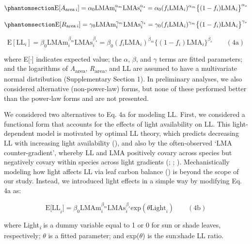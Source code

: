 \documentclass[
  12pt,
  letterpaper,
  DIV=11,
  numbers=noendperiod]{scrartcl}
\begin{document}
\begin{equation}\phantomsection\label{eq-Aarea}{
\mathrm{E}[A_{\mathrm{area} \, i}]
= \alpha_0\mathrm{LMAm}_{i}^{\alpha_m}\mathrm{LMAs}_i^{\alpha_s}  =  \alpha_0 (f_i \mathrm{LMA}_{i})^{\alpha_m} \bigl\{(1-f_i) \mathrm{LMA}_{i}\bigr\}^{\alpha_s}
}\end{equation}

\begin{equation}\phantomsection\label{eq-Rarea}{
\mathrm{E}[R_{\mathrm{area} \, i}]
= \gamma_0\mathrm{LMAm}_{i}^{\gamma_m} \mathrm{LMAs}_{i}^{\gamma_s}
= \gamma_0 (f_i \mathrm{LMA}_{i})^{\gamma_m} \bigl\{(1-f_i)\mathrm{LMA}_{i}\bigr\}^{\gamma_s}
}\end{equation}

\[
\mathrm{E}[\mathrm{LL}_i] = \beta_0\mathrm{LMAm}_{i}^{\beta_m} \mathrm{LMAs}_{i}^{\beta_s}  = \beta_0 (f_i \mathrm{LMA}_{i})^{\beta_m} \bigl\{(1-f_i) \mathrm{LMA}_{i}\bigr\}^{\beta_s} \qquad(4\mathrm{a})
\]

where E{[}\(\cdot\){]} indicates expected value; the \(\alpha\),
\(\beta\), and \(\gamma\) terms are fitted parameters; and the
logarithms of \emph{A}\textsubscript{area},
\emph{R}\textsubscript{area}, and LL are assumed to have a multivariate
normal distribution (Supplementary Section 1). In preliminary analyses,
we also considered alternative (non-power-law) forms, but none of these
performed better than the power-law forms and are not presented.

We considered two alternatives to Eq. 4a for modeling LL. First, we
considered a functional form that accounts for the effects of light
availability on LL. This light-dependent model is motivated by optimal
LL theory, which predicts decreasing LL with increasing light
availability (), and also by
the often-observed `LMA counter-gradient', whereby LL and LMA positively
covary across species but negatively covary within species across light
gradients (;
;
). Mechanistically modeling
how light affects LL via leaf carbon balance () is beyond the scope of our study. Instead, we introduced
light effects in a simple way by modifying Eq. 4a as:

\[
\mathrm{E[LL}_i] = \beta_0\mathrm{LMAm}_{i}^{\beta_m} \mathrm{LMAs}_{i}^{\beta_s} \mathrm{exp}(\theta \mathrm{Light}_i) \qquad(4\mathrm{b})
\]

where Light\textsubscript{\emph{i}} is a dummy variable equal to 1 or 0
for sun or shade leaves, respectively; \(\theta\) is a fitted parameter;
and exp(\(\theta\)) is the sun:shade LL ratio.
\end{document}

